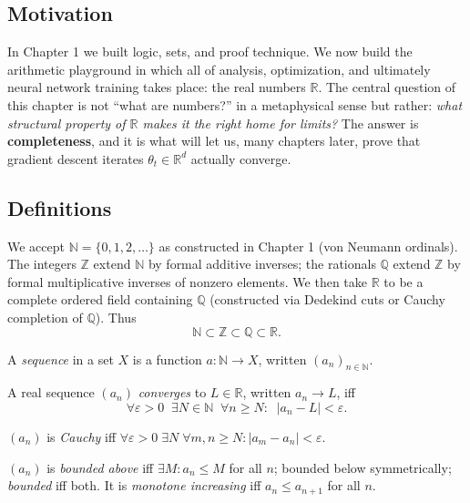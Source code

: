 \subsection*{Motivation}

In Chapter 1 we built logic, sets, and proof technique. We now build the arithmetic playground in which all of analysis, optimization, and ultimately neural network training takes place: the real numbers $\mathbb{R}$. The central question of this chapter is not ``what are numbers?'' in a metaphysical sense but rather: \emph{what structural property of $\mathbb{R}$ makes it the right home for limits?} The answer is \textbf{completeness}, and it is what will let us, many chapters later, prove that gradient descent iterates $\theta_t \in \mathbb{R}^d$ actually converge.

\subsection*{Definitions}

We accept $\mathbb{N} = \{0, 1, 2, \ldots\}$ as constructed in Chapter 1 (von Neumann ordinals). The integers $\mathbb{Z}$ extend $\mathbb{N}$ by formal additive inverses; the rationals $\mathbb{Q}$ extend $\mathbb{Z}$ by formal multiplicative inverses of nonzero elements. We then take $\mathbb{R}$ to be a complete ordered field containing $\mathbb{Q}$ (constructed via Dedekind cuts or Cauchy completion of $\mathbb{Q}$). Thus
\[
\mathbb{N} \subset \mathbb{Z} \subset \mathbb{Q} \subset \mathbb{R}.
\]

\begin{definition}[Sequence]
A \emph{sequence} in a set $X$ is a function $a : \mathbb{N} \to X$, written $(a_n)_{n \in \mathbb{N}}$.
\end{definition}

\begin{definition}
A real sequence $(a_n)$ \emph{converges} to $L \in \mathbb{R}$, written $a_n \to L$, iff
\[
\forall \varepsilon > 0 \;\; \exists N \in \mathbb{N} \;\; \forall n \geq N : \;\; |a_n - L| < \varepsilon.
\]
\end{definition}

\begin{definition}[Cauchy]
$(a_n)$ is \emph{Cauchy} iff $\forall \varepsilon > 0\; \exists N\; \forall m, n \geq N : |a_m - a_n| < \varepsilon$.
\end{definition}

\begin{definition}
$(a_n)$ is \emph{bounded above} iff $\exists M : a_n \leq M$ for all $n$; bounded below symmetrically; \emph{bounded} iff both. It is \emph{monotone increasing} iff $a_n \leq a_{n+1}$ for all $n$.
\end{definition}

